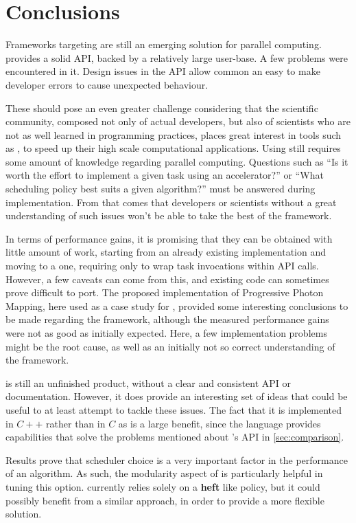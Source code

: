 \documentclass[main.tex]{subfiles}
\begin{document}
\chapter{Conclusions} \label{chapter:conclusions}

Frameworks targeting \hetplats are still an emerging solution for parallel computing. \starpu provides a solid API, backed by a relatively large user-base. A few problems were encountered in it. Design issues in the API allow common an easy to make developer errors to cause unexpected behaviour.

These should pose an even greater challenge considering that the scientific community, composed not only of actual developers, but also of scientists who are not as well learned in programming practices, places great interest in tools such as \starpu, to speed up their high scale computational applications. Using \starpu still requires some amount of knowledge regarding parallel computing. Questions such as ``Is it worth the effort to implement a given task using an accelerator?'' or ``What scheduling policy best suits a given algorithm?'' must be answered during implementation. From that comes that developers or scientists without a great understanding of such issues won't be able to take the best of the framework.

In terms of performance gains, it is promising that they can be obtained with little amount of work, starting from an already existing implementation and moving to a \starpu one, requiring only to wrap task invocations within \starpu API calls. However, a few caveats can come from this, and existing code can sometimes prove difficult to port.
The proposed implementation of Progressive Photon Mapping, here used as a case study for \starpu, provided some interesting conclusions to be made regarding the framework, although the measured performance gains were not as good as initially expected. Here, a few implementation problems might be the root cause, as well as an initially not so correct understanding of the framework.


\gama is still an unfinished product, without a clear and consistent API or documentation. However, it does provide an interesting set of ideas that could be useful to at least attempt to tackle these issues. The fact that it is implemented in $C++$ rather than in $C$ as \starpu is a large benefit, since the language provides capabilities that solve the problems mentioned about \starpu's API in \cref{sec:comparison}.

Results prove that scheduler choice is a very important factor in the performance of an algorithm. As such, the modularity aspect of \starpu is particularly helpful in tuning this option. \gama currently relies solely on a \textbf{heft} like policy, but it could possibly benefit from a similar approach, in order to provide a more flexible solution.
\end{document}
